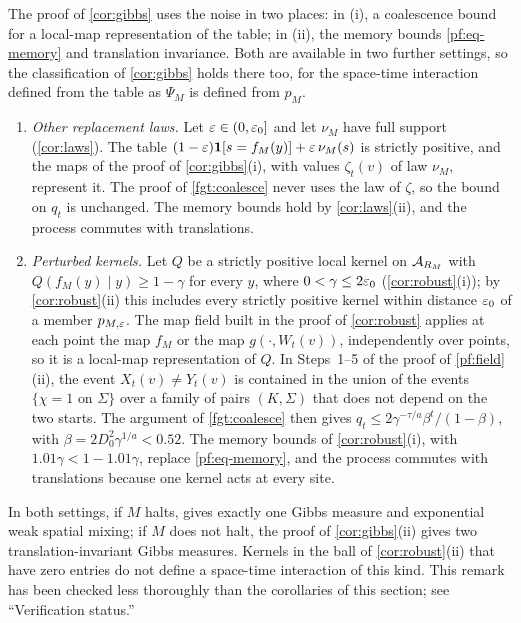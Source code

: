 \begin{remark}\label{pf:gibbs-other}
The proof of \cref{cor:gibbs} uses the noise in two places: in (i), a coalescence bound for a local-map representation of the table; in (ii), the memory bounds \eqref{pf:eq-memory} and translation invariance. Both are available in two further settings, so the classification of \cref{cor:gibbs} holds there too, for the space-time interaction defined from the table as $\Psi_M$ is defined from $p_M$.
\begin{enumerate}[label=\textup{(\alph*)}]
\item \emph{Other replacement laws.} Let $\varepsilon\in(0,\varepsilon_0]$ and let $\nu_M$ have full support (\cref{cor:laws}). The table $(1-\varepsilon)\mathbf 1[s=f_M(y)]+\varepsilon\,\nu_M(s)$ is strictly positive, and the maps of the proof of \cref{cor:gibbs}(i), with values $\zeta_t(v)$ of law $\nu_M$, represent it. The proof of \cref{fgt:coalesce} never uses the law of $\zeta$, so the bound on $q_t$ is unchanged. The memory bounds hold by \cref{cor:laws}(ii), and the process commutes with translations.
\item \emph{Perturbed kernels.} Let $Q$ be a strictly positive local kernel on $\mathcal{A}_{R_M}$ with $Q(f_M(y)\mid y)\ge1-\gamma$ for every $y$, where $0<\gamma\le2\varepsilon_0$ (\cref{cor:robust}(i)); by \cref{cor:robust}(ii) this includes every strictly positive kernel within distance $\varepsilon_0$ of a member $p_{M,\varepsilon}$. The map field built in the proof of \cref{cor:robust} applies at each point the map $f_M$ or the map $g(\cdot,W_t(v))$, independently over points, so it is a local-map representation of $Q$. In Steps~1--5 of the proof of \cref{pf:field}(ii), the event $X_t(v)\ne Y_t(v)$ is contained in the union of the events $\{\chi=1\text{ on }\Sigma\}$ over a family of pairs $(K,\Sigma)$ that does not depend on the two starts. The argument of \cref{fgt:coalesce} then gives $q_t\le2\gamma^{-\tau/a}\beta^t/(1-\beta)$, with $\beta=2D_0^2\gamma^{1/a}<0.52$. The memory bounds of \cref{cor:robust}(i), with $1.01\gamma<1-1.01\gamma$, replace \eqref{pf:eq-memory}, and the process commutes with translations because one kernel acts at every site.
\end{enumerate}
In both settings, if $M$ halts, \cite[Corollary~13.7]{DM26} gives exactly one Gibbs measure and exponential weak spatial mixing; if $M$ does not halt, the proof of \cref{cor:gibbs}(ii) gives two translation-invariant Gibbs measures. Kernels in the ball of \cref{cor:robust}(ii) that have zero entries do not define a space-time interaction of this kind. This remark has been checked less thoroughly than the corollaries of this section; see ``Verification status.''
\end{remark}


